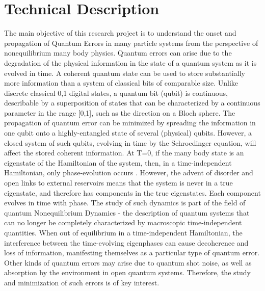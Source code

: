 \documentclass[a4paper,9pt]{article}
\begin{document}
\section{Technical Description}
The main objective of this research project is to understand the onset and propagation of Quantum Errors in many particle systems from the perspective of nonequilibrium many body physics. Quantum errors can arise due to the degradation of the physical information in the state of a quantum system as it is evolved in time. A coherent quantum state can be used to store substantially more information than a system of classical bits of comparable size. Unlike discrete classical 0,1 digital states, a quantum bit (qubit) is continuous, describable by a superposition of states that can be characterized by a continuous parameter in the range [0,1], such as the direction on a Bloch sphere. The propagation of quantum error can be minimized by spreading the information in one qubit onto a highly-entangled state of several (physical) qubits.   However, a closed system of such qubits, evolving in time by the Schroedinger equation, will affect the stored coherent information. At  T=0, if the many body state is an 
eigenstate of the Hamiltonian of the system, then, in a time-independent Hamiltonian, only phase-evolution occurs . However, the advent of disorder and open links to external reservoirs means that the system is never in a true eigenstate, and therefore has components in the true eigenstates. Each component evolves in time with phase. The study of such dynamics is part of the field of quantum Nonequilibrium Dynamics - the description of quantum systems that can no longer be completely characterized by macroscopic time-independent quantities. When out of equilibrium in a time-independent Hamiltonian, the interference between the time-evolving eigenphases can cause decoherence and loss of information, manifesting themselves as a particular type of quantum error. Other kinds of quantum errors may arise due to quantum shot noise, as well as absorption by the environment in open quantum systems. Therefore, the study and minimization of such errors is of key interest.
\end{document}
